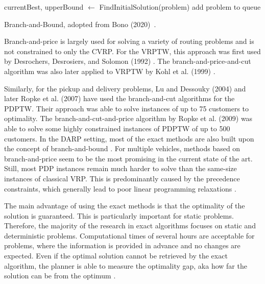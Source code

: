 \begin{algorithm}[!ht]
\SetAlgoLined
 currentBest, upperBound $\leftarrow$ FindInitialSolution(problem)\;
 add problem to queue\;
 \caption{Branch-and-Bound, adopted from Bono (2020)~\cite[p.~34~(modified)]{Bono2020}.}
 \label{alg:bab}
\end{algorithm}

Branch-and-price is largely used for solving a variety of routing problems and is not constrained to only the CVRP. For the VRPTW, this approach was first used by Desrochers, Desrosiers, and Solomon (1992) \cite{Desrochers1992}. The branch-and-price-and-cut algorithm was also later applied to VRPTW by Kohl et al. (1999) \cite{Kohl1999}.

Similarly, for the pickup and delivery problems, Lu and Dessouky (2004) \cite{branchAndCut} and later Ropke et al. (2007) \cite{branchAndCut2} have used the branch-and-cut algorithms for the PDPTW. Their approach was able to solve instances of up to 75 customers to optimality. The branch-and-cut-and-price algorithm by Ropke et al. (2009) \cite{branchCutPrice} was able to solve some highly constrained instances of PDPTW of up to 500 customers. In the DARP setting, most of the exact methods are also built upon the concept of branch-and-bound \cite{darp-survey}. For multiple vehicles, methods based on branch-and-price seem to be the most promising in the current state of the art. Still, most PDP instances remain much harder to solve than the same-size instances of classical VRP. This is predominantly caused by the precedence constraints, which generally lead to poor linear programming relaxations \cite{toth2015vrp}.

The main advantage of using the exact methods is that the optimality of the solution is guaranteed. This is particularly important for static problems. Therefore, the majority of the research in exact algorithms focuses on static and deterministic problems. Computational times of several hours are acceptable for problems, where the information is provided in advance and no changes are expected. Even if the optimal solution cannot be retrieved by the exact algorithm, the planner is able to measure the optimality gap, aka how far the solution can be from the optimum \cite{darp-survey}.


